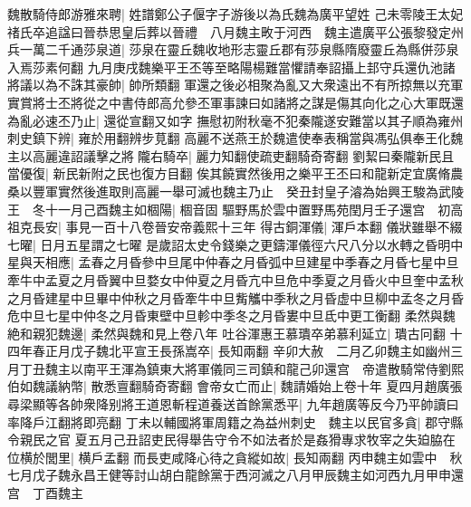 魏散騎侍郎游雅來聘|{
	姓譜鄭公子偃字子游後以為氏魏為廣平望姓}
己未零陵王太妃禇氏卒追諡曰晉恭思皇后葬以晉禮　八月魏主畋于河西　魏主遣廣平公張黎發定州兵一萬二千通莎泉道|{
	莎泉在靈丘魏收地形志靈丘郡有莎泉縣隋廢靈丘為縣併莎泉入焉莎素何翻}
九月庚戌魏樂平王丕等至略陽楊難當懼請奉詔攝上邽守兵還仇池諸將議以為不誅其豪帥|{
	帥所類翻}
軍還之後必相聚為亂又大衆遠出不有所掠無以充軍實賞將士丕將從之中書侍郎高允參丕軍事諫曰如諸將之謀是傷其向化之心大軍既還為亂必速丕乃止|{
	還從宣翻又如字}
撫慰初附秋毫不犯秦隴遂安難當以其子順為雍州刺史鎮下辨|{
	雍於用翻辨步莧翻}
高麗不送燕王於魏遣使奉表稱當與馮弘俱奉王化魏主以高麗違詔議擊之將隴右騎卒|{
	麗力知翻使疏吏翻騎奇寄翻}
劉絜曰秦隴新民且當優復|{
	新民新附之民也復方目翻}
俟其饒實然後用之樂平王丕曰和龍新定宜廣脩農桑以豐軍實然後進取則高麗一舉可滅也魏主乃止　癸丑封皇子濬為始興王駿為武陵王　冬十一月己酉魏主如棝陽|{
	棝音固}
驅野馬於雲中置野馬苑閏月壬子還宫　初高祖克長安|{
	事見一百十八卷晉安帝義熙十三年}
得古銅渾儀|{
	渾戶本翻}
儀狀雖舉不綴七曜|{
	日月五星謂之七曜}
是歲詔太史令錢樂之更鑄渾儀徑六尺八分以水轉之昏明中星與天相應|{
	孟春之月昏參中旦尾中仲春之月昏弧中旦建星中季春之月昏七星中旦牽牛中孟夏之月昏翼中旦婺女中仲夏之月昏亢中旦危中季夏之月昏火中旦奎中孟秋之月昏建星中旦畢中仲秋之月昏牽牛中旦觜觿中季秋之月昏虚中旦柳中孟冬之月昏危中旦七星中仲冬之月昏東壁中旦軫中季冬之月昏婁中旦氐中更工衡翻}
柔然與魏絶和親犯魏邊|{
	柔然與魏和見上卷八年}
吐谷渾惠王慕璝卒弟慕利延立|{
	璝古冋翻}
十四年春正月戊子魏北平宣王長孫嵩卒|{
	長知兩翻}
辛卯大赦　二月乙卯魏主如幽州三月丁丑魏主以南平王渾為鎮東大將軍儀同三司鎮和龍己卯還宫　帝遣散騎常侍劉熙伯如魏議納幣|{
	散悉亶翻騎奇寄翻}
會帝女亡而止|{
	魏請婚始上卷十年}
夏四月趙廣張尋梁顯等各帥衆降别將王道恩斬程道養送首餘黨悉平|{
	九年趙廣等反今乃平帥讀曰率降戶江翻將即亮翻}
丁未以輔國將軍周籍之為益州刺史　魏主以民官多貪|{
	郡守縣令親民之官}
夏五月己丑詔吏民得舉告守令不如法者於是姦猾專求牧宰之失廹脇在位横於閭里|{
	横戶孟翻}
而長吏咸降心待之貪縱如故|{
	長知兩翻}
丙申魏主如雲中　秋七月戊子魏永昌王健等討山胡白龍餘黨于西河滅之八月甲辰魏主如河西九月甲申還宫　丁酉魏主

